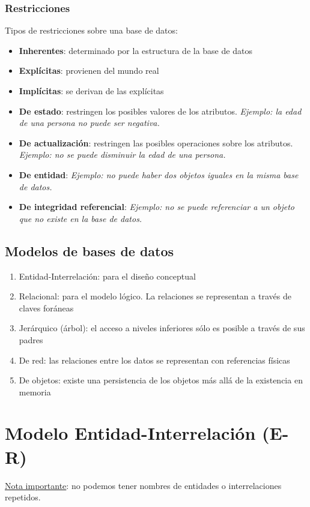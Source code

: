 \documentclass[a4paper, twoside]{article}
\begin{document}
\subsubsection{Restricciones}
Tipos de restricciones sobre una base de datos:
\begin{itemize}
	\item \textbf{Inherentes}: determinado por la estructura de la base de datos
	\item \textbf{Explícitas}: provienen del mundo real
	\item \textbf{Implícitas}: se derivan de las explícitas
	\item \textbf{De estado}: restringen los posibles valores de los atributos. \emph{Ejemplo: la edad de una persona no puede ser negativa.}
	\item \textbf{De actualización}: restringen las posibles operaciones sobre los atributos. \emph{Ejemplo: no se puede disminuir la edad de una persona.}
	\item \textbf{De entidad}: \emph{Ejemplo: no puede haber dos objetos iguales en la misma base de datos.}
	\item \textbf{De integridad referencial}: \emph{Ejemplo: no se puede referenciar a un objeto que no existe en la base de datos.}
\end{itemize}

\subsection{Modelos de bases de datos}
\begin{enumerate}
	\item Entidad-Interrelación: para el diseño conceptual
	\item Relacional: para el modelo lógico. La relaciones se representan a través de claves foráneas
	\item Jerárquico (árbol): el acceso a niveles inferiores sólo es posible a través de sus padres
	\item De red: las relaciones entre los datos se representan con referencias físicas
	\item De objetos: existe una persistencia de los objetos más allá de la existencia en memoria
\end{enumerate}

\section{Modelo Entidad-Interrelación (E-R)}
\uline{Nota importante}: no podemos tener nombres de entidades o interrelaciones repetidos.
\end{document}

